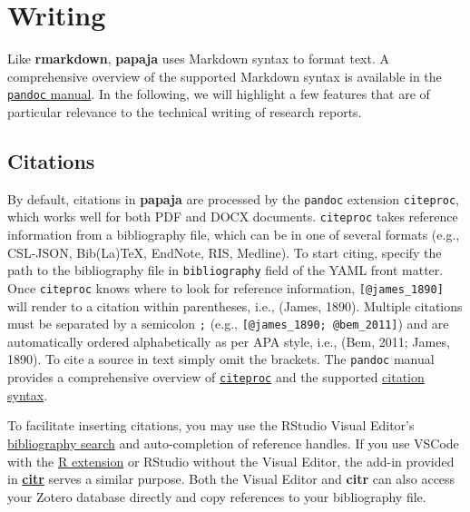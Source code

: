 \documentclass[
  english,
  ,man,floatsintext]{apa6}
\begin{document}
\section{Writing}\label{writing}

Like \textbf{rmarkdown}, \textbf{papaja} uses Markdown syntax to format text.
A comprehensive overview of the supported Markdown syntax is available in the \href{https://pandoc.org/MANUAL.html\#pandocs-markdown}{\texttt{pandoc} manual}.
In the following, we will highlight a few features that are of particular relevance to the technical writing of research reports.

\subsection{Citations}\label{citations}

By default, citations in \textbf{papaja} are processed by the \texttt{pandoc} extension \texttt{citeproc}, which works well for both PDF and DOCX documents.
\texttt{citeproc} takes reference information from a bibliography file, which can be in one of several formats (e.g., CSL-JSON, Bib(La)TeX, EndNote, RIS, Medline).
To start citing, specify the path to the bibliography file in \texttt{bibliography} field of the YAML front matter.
Once \texttt{citeproc} knows where to look for reference information, \texttt{{[}@james\_1890{]}} will render to a citation within parentheses, i.e., (James, 1890).
Multiple citations must be separated by a semicolon \texttt{;} (e.g., \texttt{{[}@james\_1890;\ @bem\_2011{]}}) and are automatically ordered alphabetically as per APA style, i.e., (Bem, 2011; James, 1890).
To cite a source in text simply omit the brackets.
The \texttt{pandoc} manual provides a comprehensive overview of \href{https://pandoc.org/MANUAL.html\#citations}{\texttt{citeproc}} and the supported \href{https://pandoc.org/MANUAL.html\#citation-syntax}{citation syntax}.

To facilitate inserting citations, you may use the RStudio Visual Editor's \href{https://rstudio.github.io/visual-markdown-editing/citations.html\#inserting-citations}{bibliography search} and auto-completion of reference handles.
If you use VSCode with the \href{https://marketplace.visualstudio.com/items?itemName=REditorSupport.r}{R extension} or RStudio without the Visual Editor, the add-in provided in \href{https://github.com/crsh/citr}{\textbf{citr}} serves a similar purpose.
Both the Visual Editor and \textbf{citr} can also access your Zotero database directly and copy references to your bibliography file.
\end{document}
